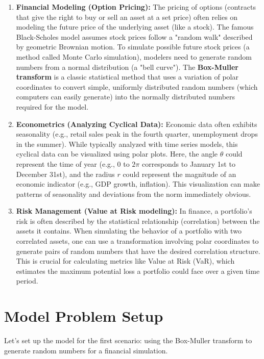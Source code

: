 \documentclass{article}
\begin{document}
\begin{enumerate}
    \item \textbf{Financial Modeling (Option Pricing):} The pricing of options (contracts that give the right to buy or sell an asset at a set price) often relies on modeling the future price of the underlying asset (like a stock). The famous Black-Scholes model assumes stock prices follow a "random walk" described by geometric Brownian motion. To simulate possible future stock prices (a method called Monte Carlo simulation), modelers need to generate random numbers from a normal distribution (a "bell curve"). The \textbf{Box-Muller transform} is a classic statistical method that uses a variation of polar coordinates to convert simple, uniformly distributed random numbers (which computers can easily generate) into the normally distributed numbers required for the model.

    \item \textbf{Econometrics (Analyzing Cyclical Data):} Economic data often exhibits seasonality (e.g., retail sales peak in the fourth quarter, unemployment drops in the summer). While typically analyzed with time series models, this cyclical data can be visualized using polar plots. Here, the angle \(\theta\) could represent the time of year (e.g., 0 to \(2\pi\) corresponds to January 1st to December 31st), and the radius \(r\) could represent the magnitude of an economic indicator (e.g., GDP growth, inflation). This visualization can make patterns of seasonality and deviations from the norm immediately obvious.

    \item \textbf{Risk Management (Value at Risk modeling):} In finance, a portfolio's risk is often described by the statistical relationship (correlation) between the assets it contains. When simulating the behavior of a portfolio with two correlated assets, one can use a transformation involving polar coordinates to generate pairs of random numbers that have the desired correlation structure. This is crucial for calculating metrics like Value at Risk (VaR), which estimates the maximum potential loss a portfolio could face over a given time period.
\end{enumerate}

\section{Model Problem Setup}
Let's set up the model for the first scenario: using the Box-Muller transform to generate random numbers for a financial simulation.
\end{document}
